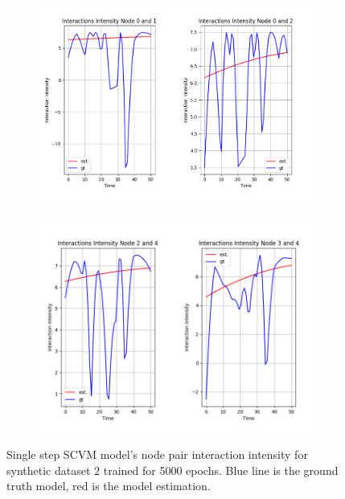 \begin{figure}[H]
    \centering
    \begin{subfigure}[b]{\textwidth}
        \centering
        \includegraphics[width=\textwidth]{0_images/rq1_2_1step_intensity_plot_node_01_02.PNG}
    \end{subfigure}
    \vfill
    \begin{subfigure}[b]{\textwidth}
        \centering
        \includegraphics[width=\textwidth]{0_images/rq1_2_1step_intensity_plot_node_23_34.PNG}
    \end{subfigure}
    \caption{Single step SCVM model's node pair interaction intensity for synthetic dataset 2 trained for 5000 epochs. Blue line is the ground truth model, red is the model estimation.}
    \label{fig:RQ1:part2:1step_intensity}
\end{figure}
